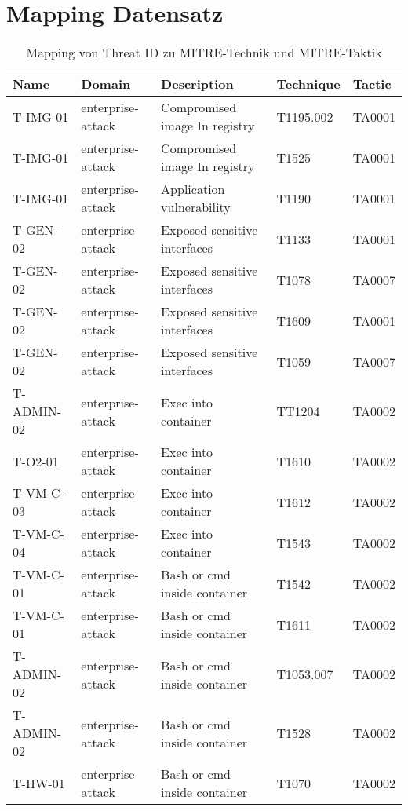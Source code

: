 \chapter{Mapping Datensatz}
\label{app:mapping-dataset}
\begin{table}[!ht]
    \caption{Mapping von Threat ID zu MITRE-Technik und MITRE-Taktik}
    \centering
    \begin{tabular}{|l|l|l|l|l|}
    \hline
        Name & Domain & Description & Technique & Tactic \\ \hline
        T-IMG-01 & enterprise-attack & Compromised image In registry & T1195.002 & TA0001 \\ \hline
        T-IMG-01 & enterprise-attack & Compromised image In registry & T1525 & TA0001 \\ \hline
        T-IMG-01 & enterprise-attack & Application vulnerability & T1190 & TA0001 \\ \hline
        T-GEN-02 & enterprise-attack & Exposed sensitive interfaces & T1133 & TA0001 \\ \hline
        T-GEN-02 & enterprise-attack & Exposed sensitive interfaces & T1078 & TA0007 \\ \hline
        T-GEN-02 & enterprise-attack & Exposed sensitive interfaces & T1609 & TA0001 \\ \hline
        T-GEN-02 & enterprise-attack & Exposed sensitive interfaces & T1059 & TA0007 \\ \hline
        T-ADMIN-02 & enterprise-attack & Exec into container & TT1204 & TA0002 \\ \hline
        T-O2-01 & enterprise-attack & Exec into container & T1610 & TA0002 \\ \hline
        T-VM-C-03 & enterprise-attack & Exec into container & T1612 & TA0002 \\ \hline
        T-VM-C-04 & enterprise-attack & Exec into container & T1543 & TA0002 \\ \hline
        T-VM-C-01 & enterprise-attack & Bash or cmd inside container & T1542 & TA0002 \\ \hline
        T-VM-C-01 & enterprise-attack & Bash or cmd inside container & T1611 & TA0002 \\ \hline
        T-ADMIN-02 & enterprise-attack & Bash or cmd inside container & T1053.007 & TA0002 \\ \hline
        T-ADMIN-02 & enterprise-attack & Bash or cmd inside container & T1528 & TA0002 \\ \hline
        T-HW-01 & enterprise-attack & Bash or cmd inside container & T1070 & TA0002 \\ \hline

\end{tabular}
\end{table}
